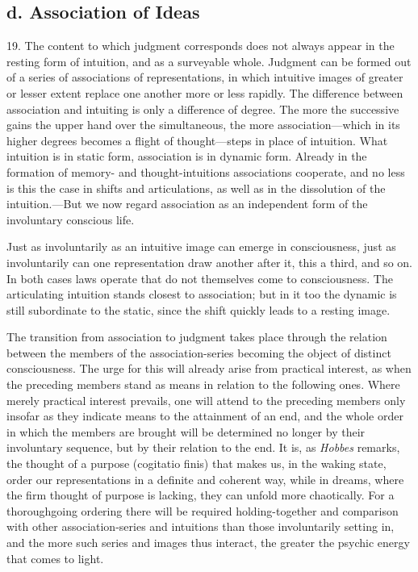 \documentclass[12pt,a4paper]{book}
\newcommand{\opage}[1]{\marginnote{\footnotesize\textit{[#1]}}}
\begin{document}
\subsection*{d. Association of Ideas}
\label{ssec:association}

19. The content to which judgment corresponds does not always appear in
the resting form of intuition, and as a surveyable whole. Judgment can be
formed out of a series of associations of representations, in which
intuitive images of greater or lesser extent replace one another more or
less rapidly. The difference between association and intuiting is only a
difference of degree. The more the successive gains the upper hand over
the simultaneous, the more association---which in its higher degrees
becomes a flight of thought---steps in place of intuition. What intuition
is in static form, association is in dynamic form. Already in the
formation of memory- and thought-intuitions associations cooperate, and
no less is this the case in shifts and articulations, as well as in the
dissolution of the intuition.---But we now regard association as an
independent form of the involuntary conscious life.

Just as involuntarily as an intuitive image can emerge in consciousness,
just as involuntarily can one representation draw another after it, this a
third, and so on. In both \opage{60}cases laws operate that do not themselves come
to consciousness. The articulating intuition stands closest to
association; but in it too the dynamic is still subordinate to the static,
since the shift quickly leads to a resting image.

The transition from association to judgment takes place through the
relation between the members of the association-series becoming the object
of distinct consciousness. The urge for this will already arise from
practical interest, as when the preceding members stand as means in
relation to the following ones. Where merely practical interest prevails,
one will attend to the preceding members only insofar as they indicate
means to the attainment of an end, and the whole order in which the
members are brought will be determined no longer by their involuntary
sequence, but by their relation to the end. It is, as \emph{Hobbes}
remarks, the thought of a purpose (cogitatio finis) that makes us, in the
waking state, order our representations in a definite and coherent way,
while in dreams, where the firm thought of purpose is lacking, they can
unfold more chaotically. For a thoroughgoing ordering there will be
required holding-together and comparison with other association-series and
intuitions than those involuntarily setting in, and the more such series
and images thus interact, the greater the psychic energy that comes to
light.
\end{document}
